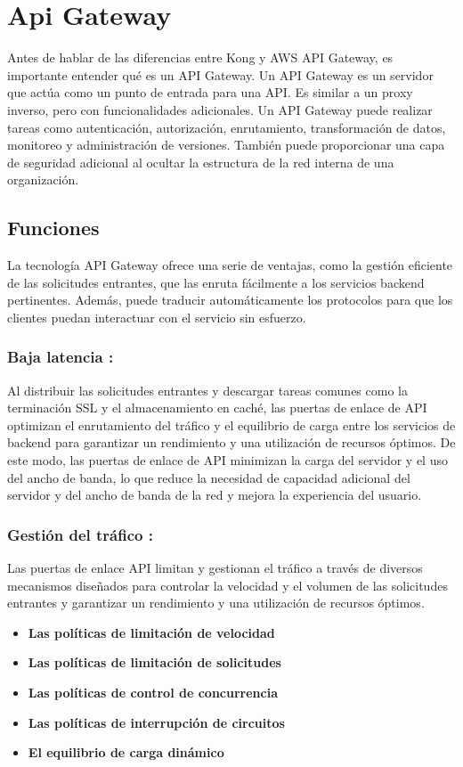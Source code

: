 \section{Api Gateway}
Antes de hablar de las diferencias entre Kong y AWS API Gateway, es importante
entender qué es un API Gateway. Un API Gateway es un servidor que actúa como
un punto de entrada para una API. Es similar a un proxy inverso, pero con
funcionalidades adicionales. Un API Gateway puede realizar tareas como
autenticación, autorización, enrutamiento, transformación de datos, monitoreo
y administración de versiones. También puede proporcionar una capa de seguridad
adicional al ocultar la estructura de la red interna de una
organización. \cite{red-hat-api-gateway}

\subsection{Funciones}
La tecnología API Gateway ofrece una serie de ventajas, como la gestión
eficiente de las solicitudes entrantes, que las enruta fácilmente a los
servicios backend pertinentes. Además, puede traducir automáticamente
los protocolos para que los clientes puedan interactuar con el servicio
sin esfuerzo. \cite{kong-what-is-api-gateway}

\subsubsection{Baja latencia :}
Al distribuir las solicitudes entrantes y descargar tareas comunes como
la terminación SSL y el almacenamiento en caché, las puertas de enlace
de API optimizan el enrutamiento del tráfico y el equilibrio de carga
entre los servicios de backend para garantizar un rendimiento y una
utilización de recursos óptimos. De este modo, las puertas de enlace de
API minimizan la carga del servidor y el uso del ancho de banda, lo que
reduce la necesidad de capacidad adicional del servidor y del ancho de
banda de la red y mejora la experiencia del usuario.

\subsubsection{Gestión del tráfico :}
Las puertas de enlace API limitan y gestionan el tráfico a través de
diversos mecanismos diseñados para controlar la velocidad y el volumen
de las solicitudes entrantes y garantizar un rendimiento y una
utilización de recursos óptimos.

\begin{itemize}
  \item {\textbf{Las políticas de limitación de velocidad}}
  \item {\textbf{Las políticas de limitación de solicitudes}}
  \item {\textbf{Las políticas de control de concurrencia}}
  \item {\textbf{Las políticas de interrupción de circuitos}}
  \item {\textbf{El equilibrio de carga dinámico}}
\end{itemize}


